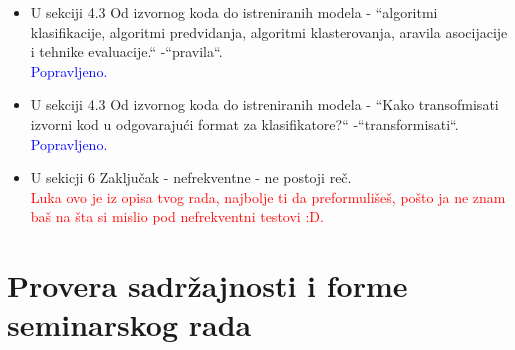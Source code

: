 \documentclass[a4paper]{report}
\newcommand{\odgovor}[1]{\textcolor{blue}{#1}}
\newcommand{\todo}[1]{\textcolor{red}{#1}}
\begin{document}
\begin{itemize}
   \item U sekciji 4.3 Od izvornog koda do istreniranih modela - ``algoritmi klasifikacije, algoritmi predvidanja, algoritmi klasterovanja, aravila asocijacije i tehnike evaluacije.`` -``pravila``.
   \\\odgovor{Popravljeno.}
   
   \item U sekciji 4.3 Od izvornog koda do istreniranih modela - ``Kako transofmisati izvorni kod u odgovarajući format za klasifikatore?`` -``transformisati``.
   \\\odgovor{Popravljeno.}
   
   \item U sekicji 6 Zaključak - nefrekventne - ne postoji reč.
   \\\todo{Luka ovo je iz opisa tvog rada, najbolje ti da preformulišeš, pošto ja ne znam baš na šta si mislio pod nefrekventni testovi :D.}
\end{itemize}


\section{Provera sadržajnosti i forme seminarskog rada}
\end{document}
